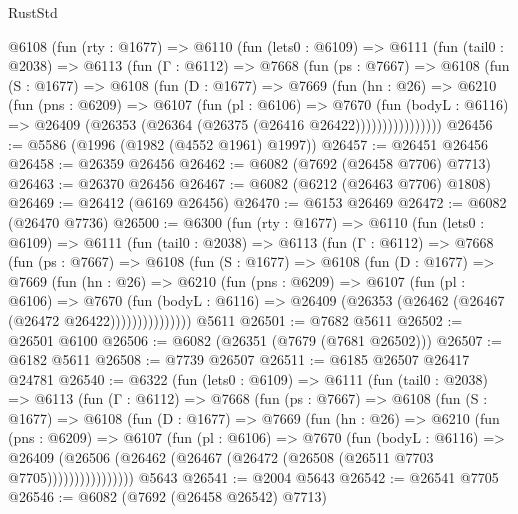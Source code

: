 \begin{lexlean}{RustStd}
\begin{coremodule}
    @6108
      (fun (rty : @1677) =>
      @6110
        (fun (lets0 : @6109) =>
        @6111
          (fun (tail0 : @2038) =>
          @6113
            (fun (Γ : @6112) =>
            @7668
              (fun (ps : @7667) =>
              @6108
                (fun (S : @1677) =>
                @6108
                  (fun (D : @1677) =>
                  @7669
                    (fun (hn : @26) =>
                    @6210
                      (fun (pns : @6209) =>
                      @6107
                        (fun (pl : @6106) =>
                        @7670
                          (fun (bodyL : @6116) =>
                          @26409 (@26353 (@26364 (@26375 (@26416 @26422))))))))))))))))
@26456 := @5586 (@1996 (@1982 (@4552 @1961) @1997))
@26457 := @26451 @26456
@26458 := @26359 @26456
@26462 := @6082 (@7692 (@26458 @7706) @7713)
@26463 := @26370 @26456
@26467 := @6082 (@6212 (@26463 @7706) @1808)
@26469 := @26412 (@6169 @26456)
@26470 := @6153 @26469
@26472 := @6082 (@26470 @7736)
@26500 := @6300
    (fun (rty : @1677) =>
    @6110
      (fun (lets0 : @6109) =>
      @6111
        (fun (tail0 : @2038) =>
        @6113
          (fun (Γ : @6112) =>
          @7668
            (fun (ps : @7667) =>
            @6108
              (fun (S : @1677) =>
              @6108
                (fun (D : @1677) =>
                @7669
                  (fun (hn : @26) =>
                  @6210
                    (fun (pns : @6209) =>
                    @6107
                      (fun (pl : @6106) =>
                      @7670
                        (fun (bodyL : @6116) =>
                        @26409 (@26353 (@26462 (@26467 (@26472 @26422)))))))))))))))
    @5611
@26501 := @7682 @5611
@26502 := @26501 @6100
@26506 := @6082 (@26351 (@7679 (@7681 @26502)))
@26507 := @6182 @5611
@26508 := @7739 @26507
@26511 := @6185 @26507 @26417 @24781
@26540 := @6322
    (fun (lets0 : @6109) =>
    @6111
      (fun (tail0 : @2038) =>
      @6113
        (fun (Γ : @6112) =>
        @7668
          (fun (ps : @7667) =>
          @6108
            (fun (S : @1677) =>
            @6108
              (fun (D : @1677) =>
              @7669
                (fun (hn : @26) =>
                @6210
                  (fun (pns : @6209) =>
                  @6107
                    (fun (pl : @6106) =>
                    @7670
                      (fun (bodyL : @6116) =>
                      @26409
                        (@26506 (@26462 (@26467 (@26472 (@26508 (@26511 @7703 @7705))))))))))))))))
    @5643
@26541 := @2004 @5643
@26542 := @26541 @7705
@26546 := @6082 (@7692 (@26458 @26542) @7713)

\end{coremodule}
\end{lexlean}
